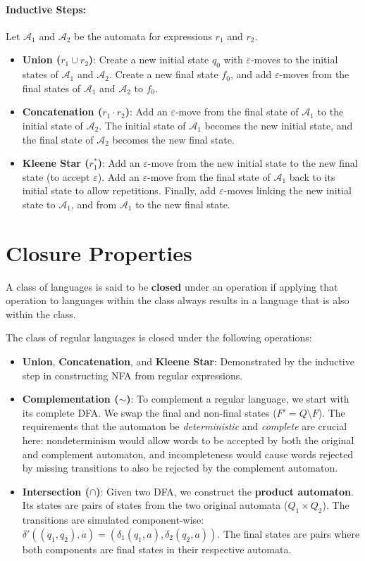 \paragraph{Inductive Steps:}
Let $\mathcal{A}_1$ and $\mathcal{A}_2$ be the automata for expressions $r_1$ and $r_2$.
\begin{itemize}
    \item \textbf{Union ($r_1 \cup r_2$)}: Create a new initial state $q_0$ with $\varepsilon$-moves to the initial states of $\mathcal{A}_1$ and $\mathcal{A}_2$. Create a new final state $f_0$, and add $\varepsilon$-moves from the final states of $\mathcal{A}_1$ and $\mathcal{A}_2$ to $f_0$.
    \item \textbf{Concatenation ($r_1 \cdot r_2$)}: Add an $\varepsilon$-move from the final state of $\mathcal{A}_1$ to the initial state of $\mathcal{A}_2$. The initial state of $\mathcal{A}_1$ becomes the new initial state, and the final state of $\mathcal{A}_2$ becomes the new final state.
    \item \textbf{Kleene Star ($r_1^*$)}: Add an $\varepsilon$-move from the new initial state to the new final state (to accept $\varepsilon$). Add an $\varepsilon$-move from the final state of $\mathcal{A}_1$ back to its initial state to allow repetitions. Finally, add $\varepsilon$-moves linking the new initial state to $\mathcal{A}_1$, and from $\mathcal{A}_1$ to the new final state.
\end{itemize}

\section{Closure Properties}

A class of languages is said to be \textbf{closed} under an operation if applying that operation to languages within the class always results in a language that is also within the class. 

The class of regular languages is closed under the following operations:
\begin{itemize}
    \item \textbf{Union}, \textbf{Concatenation}, and \textbf{Kleene Star}: Demonstrated by the inductive step in constructing NFA from regular expressions.
    \item \textbf{Complementation ($\sim$)}: To complement a regular language, we start with its complete DFA. We swap the final and non-final states ($F' = Q \setminus F$). The requirements that the automaton be \emph{deterministic} and \emph{complete} are crucial here: nondeterminism would allow words to be accepted by both the original and complement automaton, and incompleteness would cause words rejected by missing transitions to also be rejected by the complement automaton.
    \item \textbf{Intersection ($\cap$)}: Given two DFA, we construct the \textbf{product automaton}. Its states are pairs of states from the two original automata ($Q_1 \times Q_2$). The transitions are simulated component-wise: $\delta'((q_1, q_2), a) = (\delta_1(q_1, a), \delta_2(q_2, a))$. The final states are pairs where both components are final states in their respective automata.
\end{itemize}

